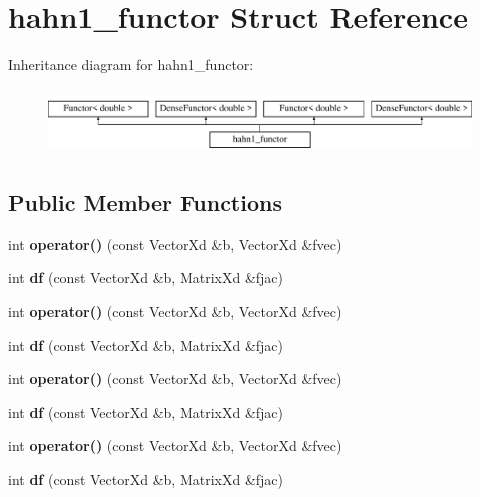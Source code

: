 \hypertarget{structhahn1__functor}{}\section{hahn1\+\_\+functor Struct Reference}
\label{structhahn1__functor}
Inheritance diagram for hahn1\+\_\+functor\+:\begin{figure}[H]
\begin{center}
\leavevmode
\includegraphics[height=1.728395cm]{structhahn1__functor}
\end{center}
\end{figure}
\subsection*{Public Member Functions}
\begin{DoxyCompactItemize}
\item 
\mbox{\label{structhahn1__functor_a0c90b30d09a59105499a1769a7b36284}} 
int {\bfseries operator()} (const Vector\+Xd \&b, Vector\+Xd \&fvec)
\item 
\mbox{\label{structhahn1__functor_aa14660411e59e9cdd1826ffbe2adff16}} 
int {\bfseries df} (const Vector\+Xd \&b, Matrix\+Xd \&fjac)
\item 
\mbox{\label{structhahn1__functor_a0c90b30d09a59105499a1769a7b36284}} 
int {\bfseries operator()} (const Vector\+Xd \&b, Vector\+Xd \&fvec)
\item 
\mbox{\label{structhahn1__functor_aa14660411e59e9cdd1826ffbe2adff16}} 
int {\bfseries df} (const Vector\+Xd \&b, Matrix\+Xd \&fjac)
\item 
\mbox{\label{structhahn1__functor_a0c90b30d09a59105499a1769a7b36284}} 
int {\bfseries operator()} (const Vector\+Xd \&b, Vector\+Xd \&fvec)
\item 
\mbox{\label{structhahn1__functor_aa14660411e59e9cdd1826ffbe2adff16}} 
int {\bfseries df} (const Vector\+Xd \&b, Matrix\+Xd \&fjac)
\item 
\mbox{\label{structhahn1__functor_a0c90b30d09a59105499a1769a7b36284}} 
int {\bfseries operator()} (const Vector\+Xd \&b, Vector\+Xd \&fvec)
\item 
\mbox{\label{structhahn1__functor_aa14660411e59e9cdd1826ffbe2adff16}} 
int {\bfseries df} (const Vector\+Xd \&b, Matrix\+Xd \&fjac)
\end{DoxyCompactItemize}
